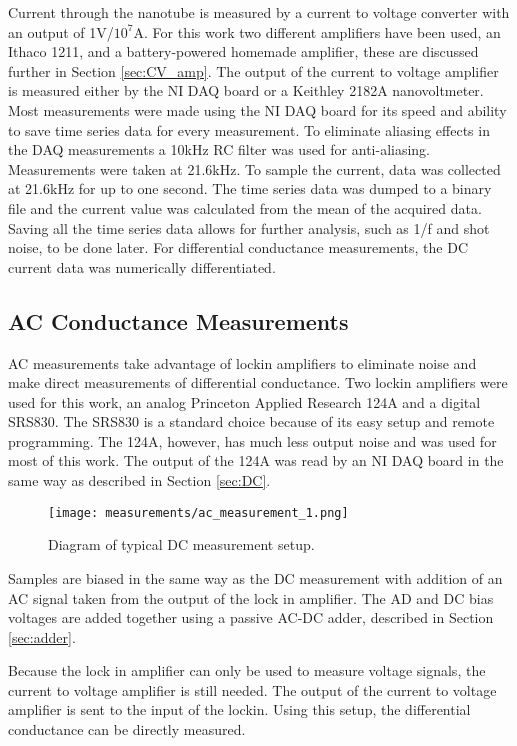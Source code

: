 Current through the nanotube is measured by a current to voltage converter with an output of 1V/$10^7$A. For this work two different amplifiers have been used, an Ithaco 1211, and a battery-powered homemade amplifier, these are discussed further in Section \ref{sec:CV_amp}. The output of the current to voltage amplifier is measured either by the NI DAQ board or a Keithley 2182A nanovoltmeter. Most measurements were made using the NI DAQ board for its speed and ability to save time series data for every measurement. To eliminate aliasing effects in the DAQ measurements a 10kHz RC filter was used for anti-aliasing. Measurements were taken at 21.6kHz. To sample the current, data was collected at 21.6kHz for up to one second. The time series data was dumped to a binary file and the current value was calculated from the mean of the acquired data. Saving all the time series data allows for further analysis, such as 1/f and shot noise, to be done later. For differential conductance measurements, the DC current data was numerically differentiated. 

\subsection{AC Conductance Measurements}

AC measurements take advantage of lockin amplifiers to eliminate noise and make direct measurements of differential conductance. Two lockin amplifiers were used for this work, an analog Princeton Applied Research 124A and a digital SRS830. The SRS830 is a standard choice because of its easy setup and remote programming. The 124A, however, has much less output noise and was used for most of this work. The output of the 124A was read by an NI DAQ board in the same way as described in Section \ref{sec:DC}.

\begin{figure}
    \centering
    \texttt{[image: measurements/ac\_measurement\_1.png]}
    \caption{Diagram of typical DC measurement setup.}
    \label{fig:ac_measurement}
\end{figure}

Samples are biased in the same way as the DC measurement with addition of an AC signal taken from the output of the lock in amplifier. The AD and DC bias voltages are added together using a passive AC-DC adder, described in Section \ref{sec:adder}. 

Because the lock in amplifier can only be used to measure voltage signals, the current to voltage amplifier is still needed. The output of the current to voltage amplifier is sent to the input of the lockin. Using this setup, the differential conductance can be directly measured.

